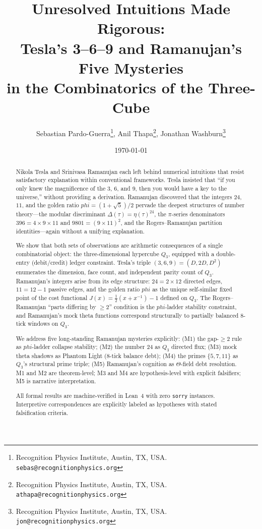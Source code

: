 \documentclass[11pt]{article}
\title{Unresolved Intuitions Made Rigorous:\\
Tesla's 3--6--9 and Ramanujan's Five Mysteries\\
in the Combinatorics of the Three-Cube}
\author{
 Sebastian Pardo-Guerra\thanks{Recognition Physics Institute, Austin, TX, USA. \texttt{sebas@recognitionphysics.org}},
 Anil Thapa\thanks{Recognition Physics Institute, Austin, TX, USA. \texttt{athapa@recognitionphysics.org}},
 Jonathan Washburn\thanks{Recognition Physics Institute, Austin, TX, USA. \texttt{jon@recognitionphysics.org}}
}
\date{\today}
\def\phig{phi}
\def\Jcost{J}
\theoremstyle{plain}
\theoremstyle{definition}
\theoremstyle{remark}
\newcommand{\phig}{\varphi}
\newcommand{\Jcost}{J}
\begin{document}
\maketitle

\begin{abstract}
Nikola Tesla and Srinivasa Ramanujan each left behind numerical intuitions that resist satisfactory explanation within conventional frameworks.
Tesla insisted that ``if you only knew the magnificence of the 3, 6, and 9, then you would have a key to the universe,'' without providing a derivation.
Ramanujan discovered that the integers $24$, $11$, and the golden ratio $\phig = (1+\sqrt{5})/2$ pervade the deepest structures of number theory---the modular discriminant $\Delta(\tau) = \eta(\tau)^{24}$, the $\pi$-series denominators $396 = 4 \times 9 \times 11$ and $9801 = (9 \times 11)^2$, and the Rogers--Ramanujan partition identities---again without a unifying explanation.

We show that both sets of observations are arithmetic consequences of a single combinatorial object: the three-dimensional hypercube $Q_3$, equipped with a double-entry (debit/credit) ledger constraint.
Tesla's triple $(3, 6, 9) = (D, 2D, D^2)$ enumerates the dimension, face count, and independent parity count of $Q_3$.
Ramanujan's integers arise from its edge structure: $24 = 2 \times 12$ directed edges, $11 = 12 - 1$ passive edges, and the golden ratio $\phig$ as the unique self-similar fixed point of the cost functional $\Jcost(x) = \tfrac{1}{2}(x + x^{-1}) - 1$ defined on $Q_3$.
The Rogers--Ramanujan ``parts differing by $\ge 2$'' condition is the $\phig$-ladder stability constraint, and Ramanujan's mock theta functions correspond structurally to partially balanced 8-tick windows on $Q_3$.

We address five long-standing Ramanujan mysteries explicitly:
(M1) the gap-$\ge 2$ rule as $\phig$-ladder collapse stability;
(M2) the number 24 as $Q_3$ directed flux;
(M3) mock theta shadows as Phantom Light (8-tick balance debt);
(M4) the primes $\{5, 7, 11\}$ as $Q_3$'s structural prime triple;
(M5) Ramanujan's cognition as $\Theta$-field debt resolution.
M1 and M2 are theorem-level; M3 and M4 are hypothesis-level with explicit falsifiers; M5 is narrative interpretation.

All formal results are machine-verified in Lean~4 with zero \texttt{sorry} instances.
Interpretive correspondences are explicitly labeled as hypotheses with stated falsification criteria.
\end{abstract}
\end{document}
